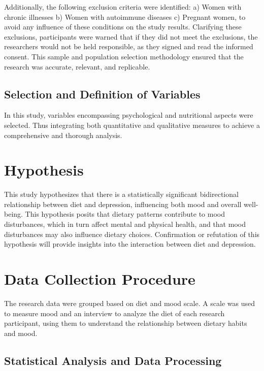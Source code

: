 \documentclass[jou]{apa7}
\begin{document}
Additionally, the following exclusion criteria were identified: a) Women with chronic illnesses b) Women with autoimmune diseases c) Pregnant women, to avoid any influence of these conditions on the study results. Clarifying these exclusions, participants were warned that if they did not meet the exclusions, the researchers would not be held responsible, as they signed and read the informed consent. This sample and population selection methodology ensured that the research was accurate, relevant, and replicable.

\subsection{Selection and Definition of Variables}\label{selecciuxf3n-y-definiciuxf3n-de-variables}

In this study, variables encompassing psychological and nutritional aspects were selected. Thus integrating both quantitative and qualitative measures to achieve a comprehensive and thorough analysis.


\section{Hypothesis}\label{hipuxf3tesis}

This study hypothesizes that there is a statistically significant bidirectional relationship between diet and depression, influencing both mood and overall well-being. This hypothesis posits that dietary patterns contribute to mood disturbances, which in turn affect mental and physical health, and that mood disturbances may also influence dietary choices. Confirmation or refutation of this hypothesis will provide insights into the interaction between diet and depression.

\section{Data Collection Procedure}\label{procedimiento-para-recolecciuxf3n-de-datos}

The research data were grouped based on diet and mood scale. A scale was used to measure mood and an interview to analyze the diet of each research participant, using them to understand the relationship between dietary habits and mood.


\subsection{Statistical Analysis and Data Processing}
\end{document}
